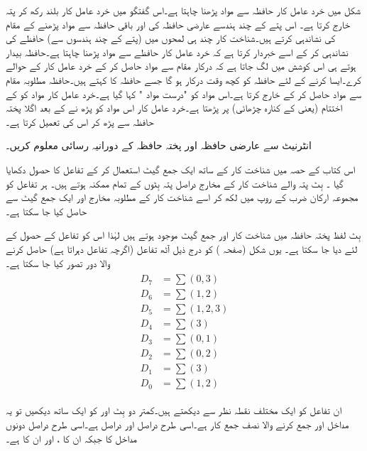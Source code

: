 شکل    میں خرد عامل کار حافظہ سے مواد پڑھنا چاہتا ہے۔اس گفتگو میں خرد عامل کار  بلند رکھ کر پتہ خارج کرتا ہے۔ اس  پتے کے چند ہندسے عارضی حافظہ کی اور باقی حافظہ سے مواد پڑھنے کے مقام کی نشاندہی کرتے ہیں۔شناخت کار چند ہی لمحوں میں (پتے کے چند ہندسوں سے) حافظے کی نشاندہی کر کے اسے خبردار کرتا ہے کہ خرد عامل کار حافظے سے مواد پڑھنا چاہتا ہے۔حافظہ بیدار ہوتے ہی اس کوشش میں لگ جاتا ہے کہ درکار مقام سے مواد حاصل کر کے خرد عامل کار کے حوالے کرے۔ایسا کرنے کے لئے حافظہ کو کچھ وقت درکار ہو گا جسے حافظہ کا  کہتے ہیں۔حافظہ مطلوبہ مقام سے مواد حاصل کر کے خارج کرتا ہے۔اس مواد کو "درست مواد " کہا گیا ہے۔خرد عامل کار مواد کو  کے اختتام  (یعنی  کے کنارہ چڑھائی)     پر پڑھتا ہے۔خرد عامل کار اس مواد کو پڑھ نے کے بعد  اگلا   پختہ حافظہ سے پڑھ کر   اس کی تعمیل کرتا ہے۔

انٹرنیٹ سے عارضی حافظہ   اور پختہ حافظہ    کے دورانیہ رسائی معلوم  کریں۔

اس کتاب کے حصہ  میں شناخت کار کے ساتھ ایک جمع گیٹ استعمال کر کے تفاعل کا حصول دکھایا گیا ۔  بِٹ پتہ والے شناخت کار کے  مخارج دراصل پتہ بِٹوں کے تمام ممکنہ  ہوتے ہیں۔ ہر تفاعل کو مجموعہ ارکان ضرب کے روپ میں لکھ کر اسے شناخت کار کے مطلوبہ مخارج اور ایک جمع گیٹ سے حاصل کیا جا سکتا ہے۔ 

 بِٹ لفظ پختہ حافظہ میں شناخت کار اور  جمع گیٹ موجود ہوتے ہیں لہٰذا اس کو  تفاعل کے حصول کے لئے  دیا جا سکتا ہے۔ یوں شکل    (صفحہ ) کو درج ذیل آٹھ تفاعل (اگرچہ  تفاعل  دہراتا ہے) حاصل کرنے والا دور تصور کیا جا سکتا ہے۔
\begin{gather}
\begin{aligned}
D_7&=\sum (0,3)\\
D_6&=\sum(1,2)\\
D_5&=\sum (1,2,3)\\
D_4&=\sum(3)\\
D_3&=\sum(0,1)\\
D_2&=\sum (0,2)\\
D_1&=\sum(3)\\
D_0&=\sum(1,2)
\end{aligned}
\end{gather}

ان تفاعل کو ایک مختلف نقطہ نظر سے دیکھتے ہیں۔کمتر دو بِٹ  اور  کو ایک ساتھ  دیکھیں تو یہ مداخل  اور  جمع کرنے والا نصف جمع کار ہے۔اسی طرح  دراصل  اور  دراصل  ہے۔اسی طرح  دراصل دونوں مداخل کا  جبکہ  ان کا ،   اور  ان کا ہے۔
